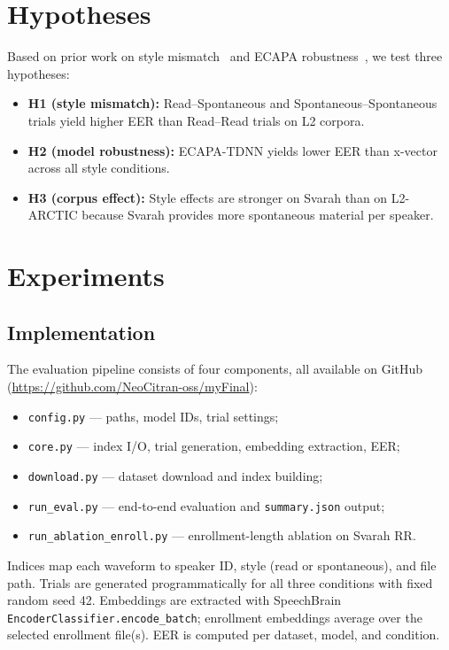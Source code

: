 \documentclass[cameraready]{Interspeech}
\begin{document}
\section{Hypotheses}
\label{sec:hypotheses}

Based on prior work on style mismatch~\cite{tom2010style,wang2020crossstyle} and ECAPA robustness~\cite{desplanques2020ecapa}, we test three hypotheses:
\begin{itemize}
  \item \textbf{H1 (style mismatch):} Read--Spontaneous and Spontaneous--Spontaneous trials yield higher EER than Read--Read trials on L2 corpora.
  \item \textbf{H2 (model robustness):} ECAPA-TDNN yields lower EER than x-vector across all style conditions.
  \item \textbf{H3 (corpus effect):} Style effects are stronger on Svarah than on L2-ARCTIC because Svarah provides more spontaneous material per speaker.
\end{itemize}

\section{Experiments}
\label{sec:experiments}

\subsection{Implementation}

The evaluation pipeline consists of four components, all available on GitHub (\url{https://github.com/NeoCitran-oss/myFinal}):
\begin{itemize}
  \item \texttt{config.py} --- paths, model IDs, trial settings;
  \item \texttt{core.py} --- index I/O, trial generation, embedding extraction, EER;
  \item \texttt{download.py} --- dataset download and index building;
  \item \texttt{run\_eval.py} --- end-to-end evaluation and \texttt{summary.json} output;
  \item \texttt{run\_ablation\_enroll.py} --- enrollment-length ablation on Svarah RR.
\end{itemize}

Indices map each waveform to speaker ID, style (read or spontaneous), and file path. Trials are generated programmatically for all three conditions with fixed random seed 42. Embeddings are extracted with SpeechBrain \texttt{EncoderClassifier.encode\_batch}; enrollment embeddings average over the selected enrollment file(s). EER is computed per dataset, model, and condition.
\end{document}

